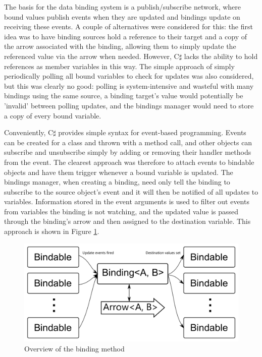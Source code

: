 \documentclass[12pt,twoside,notitlepage]{report}
\begin{document}
The basis for the data binding system is a publish/subscribe network, where bound values publish events when they are updated and bindings update on receiving these events. A couple of alternatives were considered for this: the first idea was to have binding sources hold a reference to their target and a copy of the arrow associated with the binding, allowing them to simply update the referenced value via the arrow when needed. However, C$\sharp$ lacks the ability to hold references as member variables in this way. The simple approach of simply periodically polling all bound variables to check for updates was also considered, but this was clearly no good: polling is system-intensive and wasteful with many bindings using the same source, a binding target's value would potentially be 'invalid' between polling updates, and the bindings manager would need to store a copy of every bound variable.

Conveniently, C$\sharp$ provides simple syntax for event-based programming. Events can be created for a class and thrown with a method call, and other objects can subscribe and unsubscribe simply by adding or removing their handler methods from the event. The clearest approach was therefore to attach events to bindable objects and have them trigger whenever a bound variable is updated. The bindings manager, when creating a binding, need only tell the binding to subscribe to the source object's event and it will then be notified of all updates to variables. Information stored in the event arguments is used to filter out events from variables the binding is not watching, and the updated value is passed through the binding's arrow and then assigned to the destination variable. This approach is shown in Figure \ref{fig:binding_framework}.

\begin{figure}[!ht]
  \centering
  \includegraphics[width=\textwidth]{fig/BindingFramework.pdf}
  \caption{Overview of the binding method}
  \label{fig:binding_framework}
\end{figure}
\end{document}
